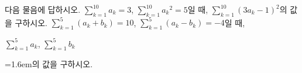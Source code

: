다음 물음에 답하시오.
 $\displaystyle\sum_{k=1}^{10}a_k=3$, $\displaystyle\sum_{k=1}^{10}a_k{}^2=5$일 때, $\displaystyle\sum_{k=1}^{10}(3a_k-1)^2$의 값을 \mbox{구하시오.}
 $\displaystyle\sum_{k=1}^{5}(a_k+b_k)=10$, $\displaystyle\sum_{k=1}^{5}(a_k-b_k)=-4$일 때, \par\smallskip\centerline{$\displaystyle\sum_{k=1}^{5}a_k$, $\displaystyle\sum_{k=1}^{5}b_k$}\par\smallskip\noindent\hangindent=1.6em\relax 의 값을 구하시오.
